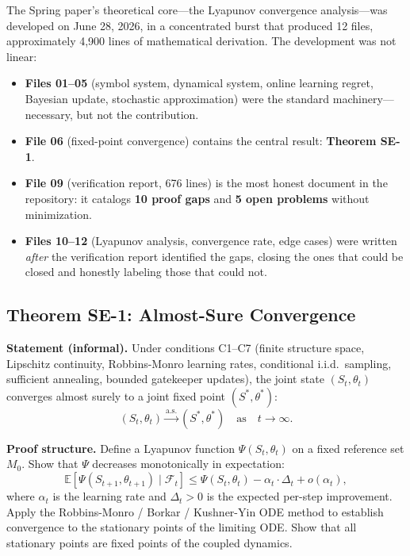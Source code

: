 \documentclass[12pt,a4paper]{ctexart}
\begin{document}
The Spring paper's theoretical core—the Lyapunov convergence analysis—was developed on June 28, 2026, in a concentrated burst that produced 12 files, approximately 4,900 lines of mathematical derivation. The development was not linear:
\begin{itemize}
\item \textbf{Files 01–05} (symbol system, dynamical system, online learning regret, Bayesian update, stochastic approximation) were the standard machinery—necessary, but not the contribution.
\item \textbf{File 06} (fixed-point convergence) contains the central result: \textbf{Theorem SE-1}.
\item \textbf{File 09} (verification report, 676 lines) is the most honest document in the repository: it catalogs \textbf{10 proof gaps} and \textbf{5 open problems} without minimization.
\item \textbf{Files 10–12} (Lyapunov analysis, convergence rate, edge cases) were written \textit{after} the verification report identified the gaps, closing the ones that could be closed and honestly labeling those that could not.
\end{itemize}

\subsection{Theorem SE-1: Almost-Sure Convergence}

\textbf{Statement (informal).} Under conditions C1–C7 (finite structure space, Lipschitz continuity, Robbins-Monro learning rates, conditional i.i.d.\ sampling, sufficient annealing, bounded gatekeeper updates), the joint state $(S_t, \theta_t)$ converges almost surely to a joint fixed point $(S^*, \theta^*)$:
\[
(S_t, \theta_t) \xrightarrow{\text{a.s.}} (S^*, \theta^*) \quad \text{as} \quad t \to \infty.
\]

\textbf{Proof structure.} Define a Lyapunov function $\Psi(S_t, \theta_t)$ on a fixed reference set $M_0$. Show that $\Psi$ decreases monotonically in expectation:
\[
\mathbb{E}[\Psi(S_{t+1}, \theta_{t+1}) \mid \mathcal{F}_t] \leq \Psi(S_t, \theta_t) - \alpha_t \cdot \Delta_t + o(\alpha_t),
\]
where $\alpha_t$ is the learning rate and $\Delta_t > 0$ is the expected per-step improvement. Apply the Robbins-Monro / Borkar / Kushner-Yin ODE method to establish convergence to the stationary points of the limiting ODE. Show that all stationary points are fixed points of the coupled dynamics.
\end{document}
